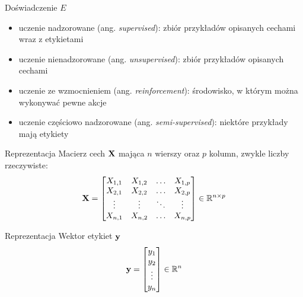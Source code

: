 \documentclass{sa}
\newcommand{\ang}[1]{(ang. \emph{#1})}
\renewcommand{\vec}[1]{\ensuremath\mathbf{#1}}
\begin{document}
\begin{frame}{Doświadczenie $E$}
\begin{itemize}
\item uczenie nadzorowane \ang{supervised}: zbiór przykładów opisanych cechami wraz z etykietami
\item uczenie nienadzorowane \ang{unsupervised}: zbiór przykładów opisanych cechami
\item uczenie ze wzmocnieniem \ang{reinforcement}: środowisko, w którym można wykonywać pewne akcje
\item uczenie częściowo nadzorowane \ang{semi-supervised}: niektóre przykłady mają etykiety
\end{itemize}
\end{frame}

\begin{frame}{Reprezentacja}
Macierz cech $\vec{X}$ mająca $n$ wierszy oraz $p$ kolumn, zwykle liczby rzeczywiste:
\[ \vec{X} = \begin{bmatrix}
X_{1,1} & X_{1,2} & \ldots & X_{1,p} \\
X_{2,1} & X_{2,2} & \ldots & X_{2,p} \\
\vdots & \vdots & \ddots & \vdots \\
X_{n,1} & X_{n,2} & \ldots & X_{n,p} \\
\end{bmatrix} \in \R^{n\times p} \]
\end{frame}

\begin{frame}{Reprezentacja}
Wektor etykiet $\vec{y}$
\[ \vec{y} = \begin{bmatrix}
y_1 \\
y_2 \\
\vdots \\
y_n
\end{bmatrix} \in \R^n \]
\end{frame}
\end{document}
